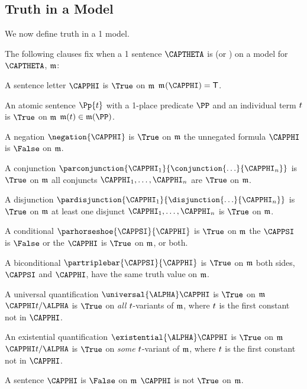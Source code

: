 
\subsection{Truth in a Model}\label{GQL1 Truth in an Interpretation}
We now define truth in a \GQL{}1 model.

\begin{majorILnc}{}
The following clauses fix when a \GQL{}1 sentence $\CAPTHETA$ is \nidf{$\True$} (or \nidf{$\False$}) on a model for $\CAPTHETA$, $\mathfrak{m}$:
\begin{cenumerate}
\item A sentence letter $\CAPPHI$ is $\True$ on $\mathfrak{m}$ \Iff $\As{}{}(\CAPPHI)=\TrueB$.
\item An atomic sentence $\Pp{\variable{t}}$ with a 1-place predicate $\PP$ and an individual term $t$ is $\True$ on $\mathfrak{m}$ \Iff $\IntA(\variable{t})\in\IntA(\PP)$.
\item A negation $\negation{\CAPPHI}$ is $\True$ on $\mathfrak{m}$ \Iff the unnegated formula $\CAPPHI$ is $\False$ on $\mathfrak{m}$.
\item A conjunction $\parconjunction{\CAPPHI_1}{\conjunction{\ldots}{\CAPPHI_{\integer{n}}}}$ is $\True$ on $\mathfrak{m}$ \Iff all conjuncts $\CAPPHI_1,\ldots,\CAPPHI_{\integer{n}}$ are $\True$ on $\mathfrak{m}$.
\item A disjunction $\pardisjunction{\CAPPHI_1}{\disjunction{\ldots}{\CAPPHI_{\integer{n}}}}$ is $\True$ on $\mathfrak{m}$ \Iff at least one disjunct $\CAPPHI_1,\ldots,\CAPPHI_{\integer{n}}$ is $\True$ on $\mathfrak{m}$.
\item A conditional $\parhorseshoe{\CAPPSI}{\CAPPHI}$ is $\True$ on $\mathfrak{m}$ \Iff the  $\CAPPSI$ is $\False$ or the  $\CAPPHI$ is $\True$ on $\mathfrak{m}$, or both.
\item A biconditional $\partriplebar{\CAPPSI}{\CAPPHI}$ is $\True$ on $\mathfrak{m}$ \Iff both sides, $\CAPPSI$ and $\CAPPHI$, have the same truth value on $\mathfrak{m}$.
\item\label{GQL1TruthUnvQuant} A universal quantification $\universal{\ALPHA}\CAPPHI$ is $\True$ on $\mathfrak{m}$ \Iff $\CAPPHI\variable{t}/\ALPHA$ is $\True$ on \emph{all} $t$-variants of $\mathfrak{m}$, where $t$ is the first constant not in $\CAPPHI$.
\item An existential quantification $\existential{\ALPHA}\CAPPHI$ is $\True$ on $\mathfrak{m}$ \Iff $\CAPPHI\variable{t}/\ALPHA$ is $\True$ on \emph{some} $t$-variant of $\mathfrak{m}$, where $t$ is the first constant not in $\CAPPHI$.
\item A sentence $\CAPPHI$ is $\False$ on $\mathfrak{m}$ \Iff $\CAPPHI$ is not $\True$ on $\mathfrak{m}$.
\end{cenumerate}
\end{majorILnc}

